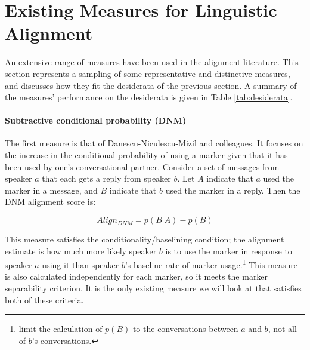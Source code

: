 \documentclass{acm_proc_article-sp}
\begin{document}

\section{Existing Measures for Linguistic Alignment}
An extensive range of measures have been used in the alignment literature.  This section represents a sampling of some representative and distinctive measures, and discusses how they fit the desiderata of the previous section.  A summary of the measures' performance on the desiderata is given in Table \ref{tab:desiderata}. 

\paragraph{Subtractive conditional probability (DNM)} The first measure is that of Danescu-Niculescu-Mizil and colleagues.\cite{DNMGamonDumais2011} It focuses on the increase in the conditional probability of using a marker given that it has been used by one's conversational partner.  Consider a set of messages from speaker $a$ that each gets a reply from speaker $b$.  Let $A$ indicate that $a$ used the marker in a message, and $B$ indicate that $b$ used the marker in a reply.  Then the DNM alignment score is:

\begin{equation}
Align_{DNM} = p(B|A) - p(B)
\end{equation}

This measure satisfies the conditionality/baselining condition; the alignment estimate is how much more likely speaker $b$ is to use the marker in response to speaker $a$ using it than speaker $b$'s baseline rate of marker usage.\footnote{\cite{DNMGamonDumais2011} limit the calculation of $p(B)$ to the conversations between $a$ and $b$, not all of $b$'s conversations.}  This measure is also calculated independently for each marker, so it meets the marker separability criterion.  It is the only existing measure we will look at that satisfies both of these criteria.
\end{document}
